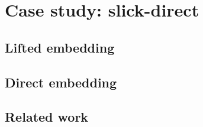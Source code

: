 \documentclass[xcolor=dvipsnames]{beamer}
\theoremstyle{definition}
\begin{document}
\section{Case study: slick-direct} %
\label{sec:Slick-direct}
\subsection{Lifted embedding} %
\label{sub:Liftedembedding}


\subsection{Direct embedding} %
\label{sub:Direct embedding}


\subsection{Related work} %
\label{sub:Related work}

\end{document}
